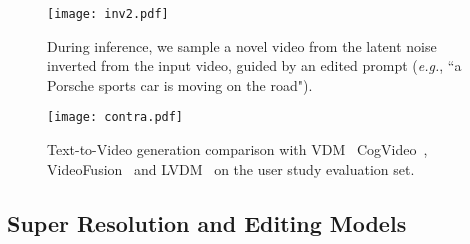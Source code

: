 \begin{figure}
    \centering
    \texttt{[image: inv2.pdf]}
    \caption{During inference, we sample a novel video from the latent noise inverted from the input video, guided by an edited prompt (\emph{e.g.}, ``a Porsche sports car is moving on the road"). }
    \label{fig:inference}
\end{figure}

\begin{figure*}
    \centering
    \texttt{[image: contra.pdf]}
    \vspace{-0.3cm}
    \caption{Text-to-Video generation comparison with VDM~\cite{vdm} CogVideo~\cite{hong2022cogvideo}, VideoFusion~\cite{videofusion} and LVDM~\cite{lvdm} on the user study evaluation set.}
    \label{fig:contra}
    \vspace{-0.3cm}
\end{figure*}

\subsection{Super Resolution and Editing Models}
\label{editing}

